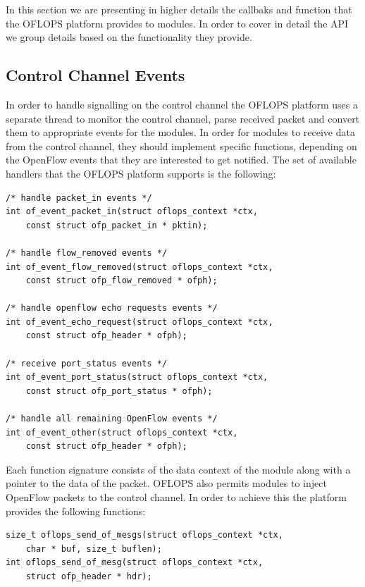 \documentclass{book}
\begin{document}
In this section we are presenting in higher details the callbaks and function
that the OFLOPS platform provides to modules. In order to cover in detail the
API we group details based on the functionality they provide.

\subsection{Control Channel Events}

In order to handle signalling on the control channel the OFLOPS platform uses a separate thread to monitor the control channel,
parse received packet and convert them to appropriate events for the modules. In order for modules to receive data from the
control channel, they should implement specific functions, depending on the
OpenFlow events that they are interested to get notified.
The set of available handlers that the OFLOPS platform supports is the following:
\begin{lstlisting}[caption={OpenFlow event callbacks}]
/* handle packet_in events */
int of_event_packet_in(struct oflops_context *ctx, 
    const struct ofp_packet_in * pktin);

/* handle flow_removed events */
int of_event_flow_removed(struct oflops_context *ctx, 
    const struct ofp_flow_removed * ofph);

/* handle openflow echo requests events */
int of_event_echo_request(struct oflops_context *ctx, 
    const struct ofp_header * ofph);

/* receive port_status events */
int of_event_port_status(struct oflops_context *ctx, 
    const struct ofp_port_status * ofph);

/* handle all remaining OpenFlow events */
int of_event_other(struct oflops_context *ctx, 
    const struct ofp_header * ofph);
\end{lstlisting}

Each function signature consists of the data context of the module along with a pointer to the data of the packet. OFLOPS also permits
modules to inject OpenFlow packets to the control channel. In order to achieve this the platform provides the following functions:

\begin{lstlisting}[caption={Control channel packet transmission}]
size_t oflops_send_of_mesgs(struct oflops_context *ctx, 
    char * buf, size_t buflen);
int oflops_send_of_mesg(struct oflops_context *ctx, 
    struct ofp_header * hdr);
\end{lstlisting}
\end{document}
